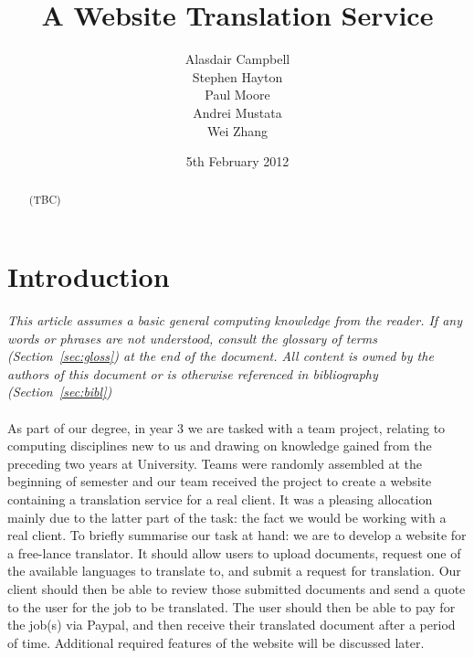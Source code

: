 \documentclass{l3proj}
\begin{document}
\title{A Website Translation Service}
\author{Alasdair Campbell \\
        Stephen Hayton \\
        Paul Moore \\
        Andrei Mustata \\
	Wei Zhang}
\date{5th February 2012}
\maketitle
\begin{abstract}

(TBC)

\end{abstract}
\educationalconsent
\tableofcontents
\chapter{Introduction}
\label{intro}
\textit{\small{This article assumes a basic general computing knowledge from the reader. If any words or phrases are not understood, consult the glossary of terms (Section~\ref{sec:gloss}) at the end of the document. All content is owned by the authors of this document or is otherwise referenced in bibliography (Section~\ref{sec:bibl})}}\\
\\
As part of our degree, in year 3 we are tasked with a team project, relating to computing disciplines new to us and drawing on knowledge gained from the preceding two years at University. Teams were randomly assembled at the beginning of semester and our team received the project to create a website containing a translation service for a real client. It was a pleasing allocation mainly due to the latter part of the task: the fact we would be working with a real client. To briefly summarise our task at hand: we are to develop a website for a free-lance translator. It should allow users to upload documents, request one of the available languages to translate to, and submit a request for translation. Our client should then be able to review those submitted documents and send a quote to the user for the job to be translated. The user should then be able to pay for the job(s) via Paypal, and then receive their translated document after a period of time. Additional required features of the website will be discussed later.\\
\\
\end{document}
